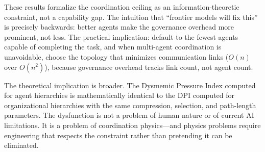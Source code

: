 \documentclass[11pt,a4paper]{article}
\begin{document}
These results formalize the coordination ceiling as an information-theoretic constraint, not a capability gap. The intuition that ``frontier models will fix this'' is precisely backwards: better agents make the governance overhead more prominent, not less. The practical implication: default to the fewest agents capable of completing the task, and when multi-agent coordination is unavoidable, choose the topology that minimizes communication links ($O(n)$ over $O(n^2)$), because governance overhead tracks link count, not agent count.

The theoretical implication is broader. The Dysmemic Pressure Index computed for agent hierarchies is mathematically identical to the DPI computed for organizational hierarchies with the same compression, selection, and path-length parameters. The dysfunction is not a problem of human nature or of current AI limitations. It is a problem of coordination physics---and physics problems require engineering that respects the constraint rather than pretending it can be eliminated.




\end{document}
